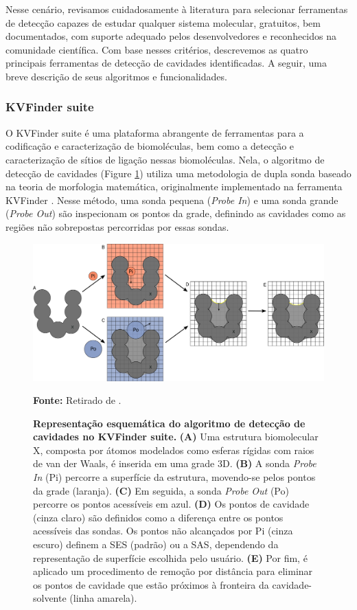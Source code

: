 \documentclass[Portugues]{phdquali}
\begin{document}
Nesse cenário, revisamos cuidadosamente à literatura para selecionar ferramentas de detecção capazes de estudar qualquer sistema molecular, gratuitos, bem documentados, com suporte adequado pelos desenvolvedores e reconhecidos na comunidade científica. Com base nesses critérios, descrevemos as quatro principais ferramentas de detecção de cavidades identificadas. A seguir, uma breve descrição de seus algoritmos e funcionalidades.

\subsubsection{KVFinder suite}

O KVFinder suite é uma plataforma abrangente de ferramentas para a codificação e caracterização de biomoléculas, bem como a detecção e caracterização de sítios de ligação nessas biomoléculas. Nela, o algoritmo de detecção de cavidades (Figure \ref{fig:kvfinder-suite-schema}) utiliza uma metodologia de dupla sonda baseado na teoria de morfologia matemática, originalmente implementado na ferramenta KVFinder \cite{oliveira2014}. Nesse método, uma sonda pequena (\textit{Probe In}) e uma sonda grande (\textit{Probe Out}) são inspecionam os pontos da grade, definindo as cavidades como as regiões não sobrepostas percorridas por essas sondas. 

\begin{figure}[ht]
  \centerline{\includegraphics[scale=0.65]{images/kvfinder-suite-schema.png}}
  \centerline{\scriptsize{\textbf{Fonte:} Retirado de \cite{guerra2023B}.}}
  \caption[Representação esquemática do algoritmo de detecção de cavidades no KVFinder suite]{\textbf{Representação esquemática do algoritmo de detecção de cavidades no KVFinder suite.} \textbf{(A)} Uma estrutura biomolecular X, composta por átomos modelados como esferas rígidas com raios de van der Waals, é inserida em uma grade 3D. \textbf{(B)} A sonda \textit{Probe In} (Pi) percorre a superfície da estrutura, movendo-se pelos pontos da grade (laranja). \textbf{(C)} Em seguida, a sonda \textit{Probe Out} (Po) percorre os pontos acessíveis em azul. \textbf{(D)} Os pontos de cavidade (cinza claro) são definidos como a diferença entre os pontos acessíveis das sondas. Os pontos não alcançados por Pi (cinza escuro) definem a SES (padrão) ou a SAS, dependendo da representação de superfície escolhida pelo usuário. \textbf{(E)} Por fim, é aplicado um procedimento de remoção por distância para eliminar os pontos de cavidade que estão próximos à fronteira da cavidade-solvente (linha amarela).}
  \label{fig:kvfinder-suite-schema}
\end{figure}
\end{document}
